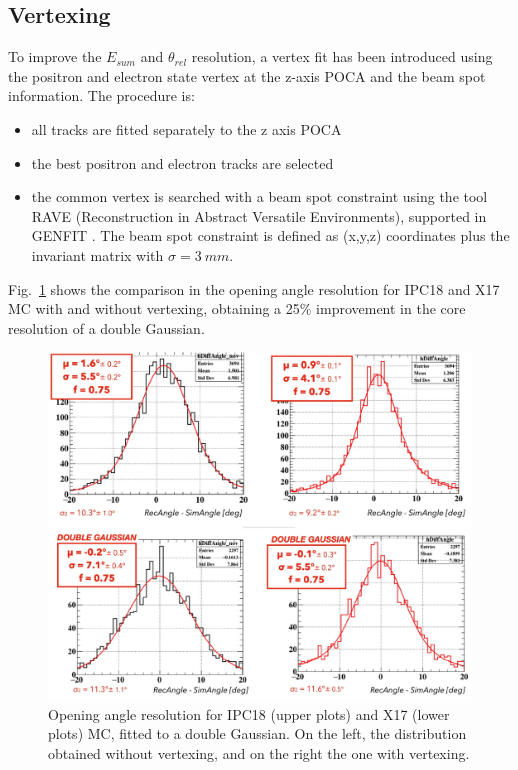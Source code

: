\begin{refsection}
        \subsection{Vertexing}
        To improve the $E_{sum}$ and $\theta_{rel}$ resolution, a vertex fit has been introduced using the positron and electron state vertex at the z-axis POCA and the beam spot information.
        The procedure is:
        \begin{itemize}
            \item all tracks are fitted separately to the z axis POCA
            \item the best positron and electron tracks are selected
            \item the common vertex is searched with a beam spot constraint using the tool RAVE (Reconstruction in Abstract Versatile Environments), supported in GENFIT \cite{RAVE}\cite{GENFIT}. The beam spot constraint is defined as (x,y,z) coordinates plus the invariant matrix with $\sigma =\SI{3}{mm}$. 
        \end{itemize}
        Fig.~\ref{fig:vertexing} shows the comparison in the opening angle resolution for IPC18 and X17 MC with and without vertexing, obtaining a 25$\%$ improvement in the core resolution of a double Gaussian.
        
        \begin{figure}[htbp]
            \centering
            \includegraphics[scale=0.5]{Figures/X17/Analysis/Vertexing.pdf}
            \caption[X17: Opening angle w/wo vertexing]{Opening angle resolution for IPC18 (upper plots) and X17 (lower plots) MC, fitted to a double Gaussian. On the left, the distribution obtained without vertexing, and on the right the one with vertexing.}
             \label{fig:vertexing}
        \end{figure}


\end{refsection}
